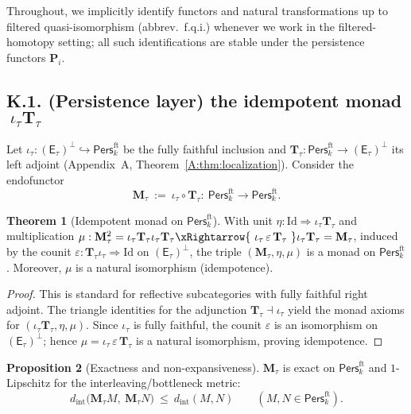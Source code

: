 \documentclass[11pt]{article}
\numberwithin{equation}{section}
\theoremstyle{plain}
\theoremstyle{definition}
\theoremstyle{remark}
\DeclareRobustCommand{\hyp}{\nobreakdash-}
\newcommand{\Pers}{\mathsf{Pers}}
\theoremstyle{plain}
\theoremstyle{definition}
\numberwithin{equation}{section}
\newtheorem{theorem}{Theorem}[section]
\newtheorem{proposition}[theorem]{Proposition}
\theoremstyle{definition}
\numberwithin{equation}{section}
\theoremstyle{plain}
\theoremstyle{definition}
\theoremstyle{remark}
\begin{document}
\medskip
\noindent
Throughout, we implicitly identify functors and natural transformations up to filtered quasi\hyp isomorphism (abbrev.\ f.q.i.) whenever we work in the filtered\hyp homotopy setting; all such identifications are stable under the persistence functors \(\mathbf{P}_i\).

\subsection*{K.1. (Persistence layer) the idempotent monad \(\ \iota_\tau\mathbf{T}_\tau\)}
Let \(\iota_\tau:(\mathsf{E}_\tau)^\perp\hookrightarrow \Pers^{\mathrm{ft}}_k\) be the fully faithful inclusion and \(\mathbf{T}_\tau:\Pers^{\mathrm{ft}}_k\to(\mathsf{E}_\tau)^\perp\) its left adjoint (Appendix~A, Theorem~\ref{A:thm:localization}). Consider the endofunctor
\[
\mathbf{M}_\tau\ :=\ \iota_\tau\circ \mathbf{T}_\tau:\ \Pers^{\mathrm{ft}}_k\longrightarrow \Pers^{\mathrm{ft}}_k.
\]

\begin{theorem}[Idempotent monad on \(\Pers^{\mathrm{ft}}_k\)]\label{K:thm:monad}
With unit \(\eta:\mathrm{Id}\Rightarrow \iota_\tau\mathbf{T}_\tau\) and multiplication
\(\mu:\mathbf{M}_\tau^2=\iota_\tau\mathbf{T}_\tau\iota_\tau\mathbf{T}_\tau\xRightarrow{\ \iota_\tau\,\varepsilon\,\mathbf{T}_\tau\ }\iota_\tau\mathbf{T}_\tau=\mathbf{M}_\tau\),
induced by the counit \(\varepsilon:\mathbf{T}_\tau\iota_\tau\Rightarrow \mathrm{Id}\) on \((\mathsf{E}_\tau)^\perp\), the triple \((\mathbf{M}_\tau,\eta,\mu)\) is a monad on \(\Pers^{\mathrm{ft}}_k\).
Moreover, \(\mu\) is a natural isomorphism (idempotence).
\end{theorem}

\begin{proof}
This is standard for reflective subcategories with fully faithful right adjoint. The triangle identities for the adjunction \(\mathbf{T}_\tau\dashv\iota_\tau\) yield the monad axioms for \((\iota_\tau\mathbf{T}_\tau,\eta,\mu)\). Since \(\iota_\tau\) is fully faithful, the counit \(\varepsilon\) is an isomorphism on \((\mathsf{E}_\tau)^\perp\); hence \(\mu=\iota_\tau\,\varepsilon\,\mathbf{T}_\tau\) is a natural isomorphism, proving idempotence.
\end{proof}

\begin{proposition}[Exactness and non\hyp expansiveness]\label{K:prop:exact-lip}
\(\mathbf{M}_\tau\) is exact on \(\Pers^{\mathrm{ft}}_k\) and \(1\)\hyp Lipschitz for the interleaving/bottleneck metric:
\[
d_{\mathrm{int}}\!\big(\mathbf{M}_\tau M,\ \mathbf{M}_\tau N\big)\ \le\ d_{\mathrm{int}}(M,N)\qquad(M,N\in\Pers^{\mathrm{ft}}_k).
\]
\end{proposition}
\end{document}
